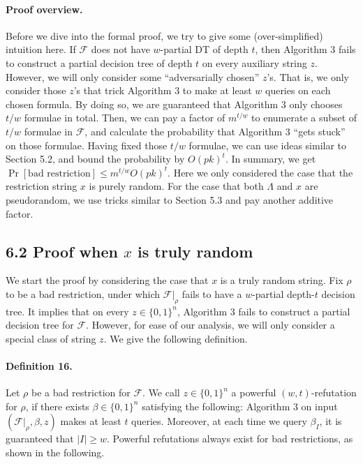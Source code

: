 \paragraph{Proof overview.} Before we dive into the formal proof, we try to give some (over-simplified) intuition here. If $\mathcal F$ does not have $w$-partial DT of depth $t$, then Algorithm 3 fails to construct a partial decision tree of depth $t$ on every auxiliary string $z$. However, we will only consider some ``adversarially chosen'' $z$'s. That is, we only consider those $z$'s that trick Algorithm 3 to make at least $w$ queries on each chosen formula. By doing so, we are guaranteed that Algorithm 3 only chooses $t/w$ formulae in total. Then, we can pay a factor of $m^{t/w}$ to enumerate a subset of $t/w$ formulae in $\mathcal F$, and calculate the probability that Algorithm 3 ``gets stuck'' on those formulae. Having fixed those $t/w$ formulae, we can use ideas similar to Section 5.2, and bound the probability by $O(pk)^t$. In summary, we get $\Pr[\text{bad restriction}]\le m^{t/w}O(pk)^t$. Here we only considered the case that the restriction string $x$ is purely random. For the case that both $\Lambda$ and $x$ are pseudorandom, we use tricks similar to Section 5.3 and pay another additive factor.
\subsection*{6.2 Proof when $x$ is truly random}
We start the proof by considering the case that $x$ is a truly random string. Fix $\rho$ to be a bad restriction, under which $\mathcal F|_\rho$ fails to have a $w$-partial depth-$t$ decision tree. It implies that on every $z\in\{0,1\}^n$, Algorithm 3 fails to construct a partial decision tree for $\mathcal F$. However, for ease of our analysis, we will only consider a special class of string $z$. We give the following definition.
\paragraph{Definition 16.} Let $\rho$ be a bad restriction for $\mathcal F$. We call $z\in\{0,1\}^n$ a powerful $(w,t)$-refutation for $\rho$, if there exists $\beta\in\{0,1\}^n$ satisfying the following: Algorithm 3 on input $(\mathcal F|_\rho,\beta,z)$ makes at least $t$ queries. Moreover, at each time we query $\beta_I$, it is guaranteed that $|I|\ge w$.
Powerful refutations always exist for bad restrictions, as shown in the following.

